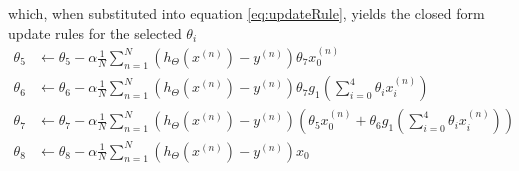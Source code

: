 \documentclass [11pt]{article}
\begin{document}
which, when substituted into equation \ref{eq:updateRule}, yields the closed form update rules for the selected $\theta_{i}$
\begin{equation*}
\begin{split}
\theta_{5} & \gets \theta_{5} - \alpha \frac{1}{N}\sum_{n=1}^{N}(h_{\Theta}(x^{(n)})-y^{(n)}) \theta_{7}x_{0}^{(n)} \\
\theta_{6} & \gets \theta_{6} - \alpha \frac{1}{N}\sum_{n=1}^{N}(h_{\Theta}(x^{(n)})-y^{(n)})\theta_{7}g_{1}(\sum_{i=0}^{4}\theta_{i}x_{i}^{(n)}) \\
\theta_{7} & \gets \theta_{7} - \alpha \frac{1}{N}\sum_{n=1}^{N}(h_{\Theta}(x^{(n)})-y^{(n)})(\theta_{5}x_{0}^{(n)}+\theta_{6}g_{1}(\sum_{i=0}^{4}\theta_{i}x_{i}^{(n)})) \\
\theta_{8} & \gets \theta_{8} - \alpha \frac{1}{N}\sum_{n=1}^{N}(h_{\Theta}(x^{(n)})-y^{(n)})x_{0}
\end{split}
\end{equation*}
\end{document}
